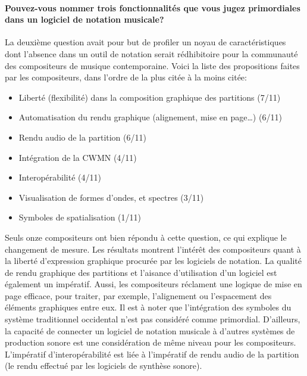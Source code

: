 \paragraph{Pouvez-vous nommer trois fonctionnalités que vous jugez primordiales dans un logiciel de notation musicale?} La deuxième question avait pour but de profiler un noyau de caractéristiques dont l'absence dans un outil de notation serait rédhibitoire pour la communauté des compositeurs de musique contemporaine.
Voici la liste des propositions faites par les compositeurs, dans l'ordre de la plus citée à la moins citée:
\begin{itemize}[label=--]
	\item Liberté (flexibilité) dans la composition graphique des partitions (7/11)
	\item Automatisation du rendu graphique (alignement, mise en page…) (6/11)
	\item Rendu audio de la partition (6/11)
	\item Intégration de la CWMN (4/11)
	\item Interopérabilité (4/11)
	\item Visualisation de formes d'ondes, et spectres (3/11)
	\item Symboles de spatialisation (1/11)
\end{itemize}

Seuls onze compositeurs ont bien répondu à cette question, ce qui explique le changement de mesure. Les résultats montrent l'intérêt des compositeurs quant à la liberté d'expression graphique procurée par les logiciels de notation. La qualité de rendu graphique des partitions et l'aisance d'utilisation d'un logiciel est également un impératif. Aussi, les compositeurs réclament une logique de mise en page efficace, pour traiter, par exemple, l'alignement ou l'espacement des éléments graphiques entre eux.
Il est à noter que l'intégration des symboles du système traditionnel occidental n'est pas considéré comme primordial. D'ailleurs, la capacité de connecter un logiciel de notation musicale à d'autres systèmes de production sonore est une considération de même niveau pour les compositeurs. L'impératif d'interopérabilité est liée à l'impératif de rendu audio de la partition (le rendu effectué par les logiciels de synthèse sonore).


